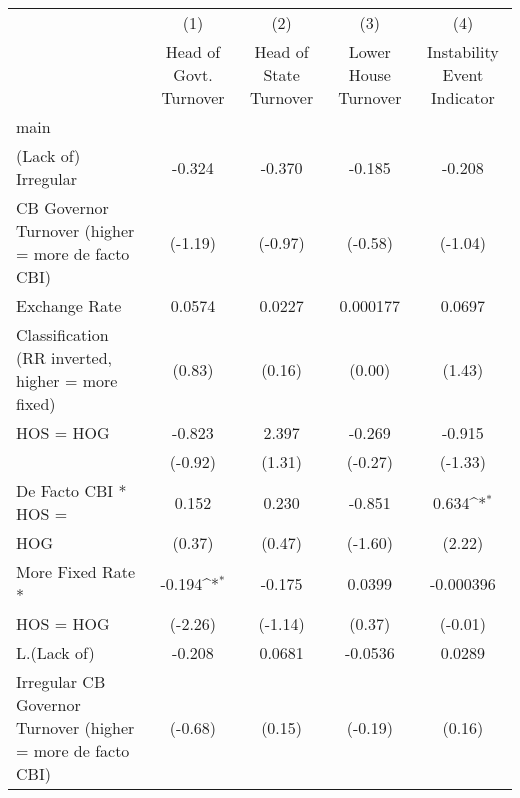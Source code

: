 {
\def\sym#1{\ifmmode^{#1}\else\(^{#1}\)\fi}
\begin{tabular}{l*{4}{c}}
\hline\hline
                    &\multicolumn{1}{c}{(1)}&\multicolumn{1}{c}{(2)}&\multicolumn{1}{c}{(3)}&\multicolumn{1}{c}{(4)}\\
                    &\multicolumn{1}{c}{Head of Govt. Turnover}&\multicolumn{1}{c}{Head of State Turnover}&\multicolumn{1}{c}{Lower House Turnover}&\multicolumn{1}{c}{Instability Event Indicator}\\
\hline
main                &                     &                     &                     &                     \\
(Lack of) Irregular &      -0.324         &      -0.370         &      -0.185         &      -0.208         \\
CB Governor Turnover (higher = more de facto CBI)&     (-1.19)         &     (-0.97)         &     (-0.58)         &     (-1.04)         \\
[1em]
Exchange Rate       &      0.0574         &      0.0227         &    0.000177         &      0.0697         \\
Classification (RR inverted, higher = more fixed)&      (0.83)         &      (0.16)         &      (0.00)         &      (1.43)         \\
[1em]
HOS = HOG           &      -0.823         &       2.397         &      -0.269         &      -0.915         \\
                    &     (-0.92)         &      (1.31)         &     (-0.27)         &     (-1.33)         \\
[1em]
De Facto CBI * HOS =&       0.152         &       0.230         &      -0.851         &       0.634\sym{*}  \\
HOG                 &      (0.37)         &      (0.47)         &     (-1.60)         &      (2.22)         \\
[1em]
More Fixed Rate *   &      -0.194\sym{*}  &      -0.175         &      0.0399         &   -0.000396         \\
HOS = HOG           &     (-2.26)         &     (-1.14)         &      (0.37)         &     (-0.01)         \\
[1em]
L.(Lack of)         &      -0.208         &      0.0681         &     -0.0536         &      0.0289         \\
Irregular CB Governor Turnover (higher = more de facto CBI)&     (-0.68)         &      (0.15)         &     (-0.19)         &      (0.16)         \\

\end{tabular}}
